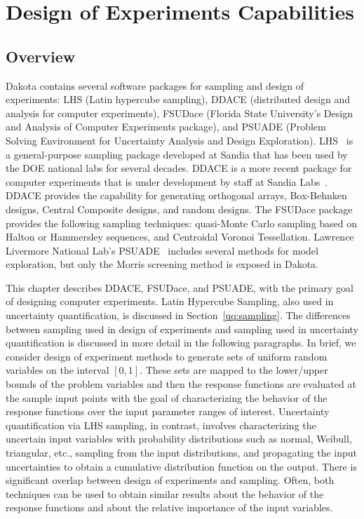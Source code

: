 \chapter{Design of Experiments Capabilities}\label{dace}

\section{Overview}\label{dace:overview}

Dakota contains several software packages for sampling and design of
experiments: LHS (Latin hypercube sampling), DDACE (distributed design
and analysis for computer experiments), FSUDace (Florida State
University's Design and Analysis of Computer Experiments package), and
PSUADE (Problem Solving Environment for Uncertainty Analysis and
Design Exploration).  LHS~\cite{Swi04} is a general-purpose sampling
package developed at Sandia that has been used by the DOE national
labs for several decades. DDACE is a more recent package for computer
experiments that is under development by staff at Sandia
Labs~\cite{TonXX}. DDACE provides the capability for generating
orthogonal arrays, Box-Behnken designs, Central Composite designs, and
random designs.  The FSUDace package provides the following sampling
techniques: quasi-Monte Carlo sampling based on Halton or Hammersley
sequences, and Centroidal Voronoi Tessellation.  Lawrence Livermore
National Lab's PSUADE~\cite{Ton05} includes several methods for model
exploration, but only the Morris screening method is exposed in Dakota.

This chapter describes DDACE, FSUDace, and PSUADE, with the primary
goal of designing computer experiments. Latin Hypercube Sampling, also
used in uncertainty quantification, is discussed in
Section~\ref{uq:sampling}.  The differences between sampling used in
design of experiments and sampling used in uncertainty quantification
is discussed in more detail in the following paragraphs. In brief, we
consider design of experiment methods to generate sets of uniform
random variables on the interval $[0,1]$. These sets are mapped to the
lower/upper bounds of the problem variables and then the response
functions are evaluated at the sample input points with the goal of
characterizing the behavior of the response functions over the input
parameter ranges of interest. Uncertainty quantification via LHS
sampling, in contrast, involves characterizing the uncertain input
variables with probability distributions such as normal, Weibull,
triangular, etc., sampling from the input distributions, and
propagating the input uncertainties to obtain a cumulative
distribution function on the output. There is significant overlap
between design of experiments and sampling. Often, both techniques can
be used to obtain similar results about the behavior of the response
functions and about the relative importance of the input variables.


